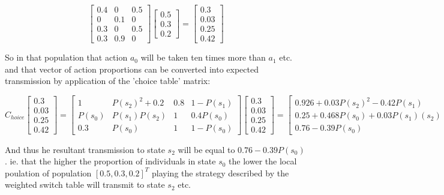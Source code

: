 \documentclass[journal,article,accept,oneauthors,pdftex,10pt,a4paper]{mdpi}
\begin{document}
$$ \begin{bmatrix}
    0.4&0&0.5 \\
    0&0.1&0 \\
    0.3&0&0.5 \\
    0.3&0.9&0
\end{bmatrix}\begin{bmatrix}
    0.5 \\
    0.3 \\
    0.2
\end{bmatrix} = \begin{bmatrix}
    0.3 \\
    0.03 \\
    0.25 \\
    0.42
\end{bmatrix} $$

So in that population that action $a_0$ will be taken ten times more than $a_1$ etc.
and that vector of action proportions can be converted into expected transmission by application of the 'choice table' matrix:

$$C_{hoice}
\begin{bmatrix}
    0.3 \\
    0.03 \\
    0.25 \\
    0.42
\end{bmatrix}
=
\begin{bmatrix}
    1&P(s_2)^2+0.2&0.8&1-P(s_1)\\
    P(s_0)&P(s_1)P(s_2)&1&0.4P(s_0)\\
    0.3&P(s_0)&1&1-P(s_0)
\end{bmatrix}
\begin{bmatrix}
    0.3 \\
    0.03 \\
    0.25 \\
    0.42
\end{bmatrix} = \begin{bmatrix}
    0.926+0.03P(s_2)^2-0.42P(s_1) \\
    0.25+0.468P(s_0)+0.03P(s_1)(s_2) \\
    0.76-0.39P(s_0)
\end{bmatrix}
$$

And thus he resultant transmission to state $s_2$ will be equal to $0.76-0.39P(s_0)$. ie. that the higher the proportion of individuals in state $s_0$ the lower the local poulation of population $[0.5,0.3,0.2]^T$ playing the strategy described by the weighted switch table will transmit to state $s_2$ etc.
\end{document}
